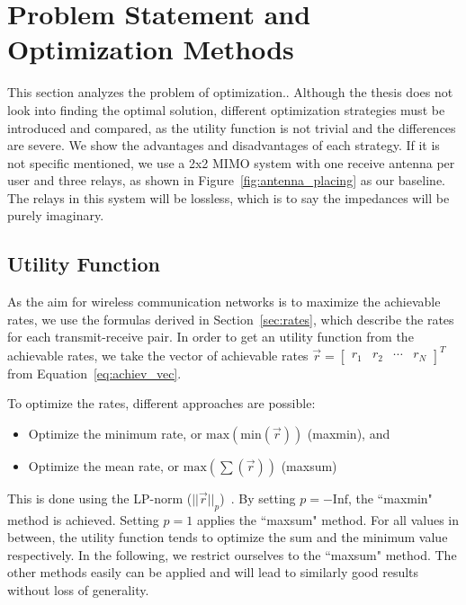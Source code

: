 \chapter{Problem Statement and Optimization Methods}
\label{sec:solver}

This section analyzes the problem of optimization..
Although the thesis does not look into finding the optimal solution, different optimization strategies must be introduced and compared, as the utility function is not trivial and the differences are severe.
We show the advantages and disadvantages of each strategy.
If it is not specific mentioned, we use a 2x2 MIMO system with one receive antenna per user and three relays, as shown in Figure~\ref{fig:antenna_placing} as our baseline.
The relays in this system will be lossless, which is to say the impedances will be purely imaginary.

\section{Utility Function}
\label{sec:utility_function}
As the aim for wireless communication networks is to maximize the achievable rates, we use the formulas derived in Section~\ref{sec:rates}, which describe the rates for each transmit-receive pair.
In order to get an utility function from the achievable rates, we take the vector of achievable rates $\vec{r} = \begin{bmatrix}
r_1 & r_2 & \cdots & r_N
\end{bmatrix}^T$ from Equation~\eqref{eq:achiev_vec}.

To optimize the rates, different approaches are possible:
\begin{itemize}
\item Optimize the minimum rate, or $\text{max}\left(\text{min}(\vec{r})\right)$ (maxmin), and
\item Optimize the mean rate, or $\text{max}\left(\sum(\vec{r})\right)$ (maxsum)
\end{itemize}

This is done using the LP-norm ($||\vec{r}||_p$)~\cite[p.853]{Kreyszig}.
By setting $p = -\text{Inf}$, the ``maxmin" method is achieved.
Setting $p = 1$ applies the ``maxsum" method.
For all values in between, the utility function tends to optimize the sum and the minimum value respectively.
In the following, we restrict ourselves to the ``maxsum" method.
The other methods easily can be applied and will lead to similarly good results without loss of generality.

